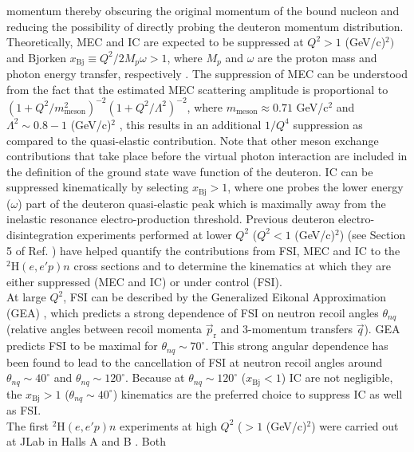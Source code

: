 \documentclass[aps,prl,twocolumn,showpacs,superscriptaddress,groupedaddress]{revtex4-2}  %
\begin{document}
momentum thereby obscuring the original momentum of the bound nucleon and reducing the possibility of directly probing the deuteron momentum distribution. \\
\indent Theoretically, MEC and IC are expected to be suppressed at $Q^{2}>1$ (GeV/c)$^{2})$ and Bjorken $x_{\mathrm{Bj}}\equiv Q^{2}/2M_{p}\omega>1$, where $M_{p}$ and $\omega$ are the proton mass and photon energy transfer, respectively \cite{sargsian_2015}.
The suppression of MEC can be understood from the fact that the estimated MEC scattering amplitude is proportional to  $(1 + Q^{2}/m^{2}_{\mathrm{meson}})^{-2}(1+Q^{2}/\Lambda^{2})^{-2}$, where $m_{\mathrm{meson}}\approx0.71$ GeV/c$^{2}$ and
$\Lambda^{2}\sim 0.8-1 $ (GeV/c)$^{2}$ \cite{Sargsian_2001}, this results in an additional $1/Q^{4}$ suppression as compared to the quasi-elastic contribution. Note that other meson exchange contributions that take place before the virtual photon interaction are included in the definition of the ground state wave function of the deuteron. IC can be suppressed kinematically by selecting $x_{\mathrm{Bj}}>1$, where one probes the lower energy ($\omega$) part of the deuteron quasi-elastic peak which is maximally away from the inelastic resonance
electro-production threshold. Previous deuteron electro-disintegration experiments performed at lower $Q^{2}$ ($Q^{2}<1$ (GeV/c)$^{2}$) (see Section 5 of Ref. \cite{sargsian_2015}) have helped quantify the contributions
from FSI, MEC and IC to the $^{2}\mathrm{H}(e,e'p)n$ cross sections and to determine the kinematics at which they are either suppressed (MEC and IC) or under control (FSI).  \\
\indent At large $Q^{2}$, FSI can be described by the Generalized Eikonal Approximation (GEA) \cite{Sargsian_2001,PhysRevC.56.1124,sargsian_2015}, which predicts a strong dependence of FSI on neutron recoil angles $\theta_{nq}$ (relative angles between recoil momenta $\vec{p}_{\mathrm{r}}$ and 3-momentum transfers $\vec{q}$).
GEA predicts FSI to be maximal for $\theta_{nq}\sim70^{\circ}$. This strong angular dependence has been found to lead to the cancellation of FSI at neutron recoil angles around $\theta_{nq}\sim40^{\circ}$ and $\theta_{nq}\sim120^{\circ}$. Because at
$\theta_{nq}\sim120^{\circ}$ ($x_{\mathrm{Bj}}<1$) IC are not negligible, the $x_{\mathrm{Bj}}>1$ ($\theta_{nq}\sim40^{\circ}$) kinematics are the preferred choice to suppress IC as well as FSI. \\
\indent The first $^{2}\mathrm{H}(e,e'p)n$ experiments at high $Q^{2}$ ($>1$ (GeV/c)$^{2}$) were carried out at JLab in Halls A \cite{PhysRevLett.107.262501} and B \cite{PhysRevLett.98.262502}. Both
\end{document}
